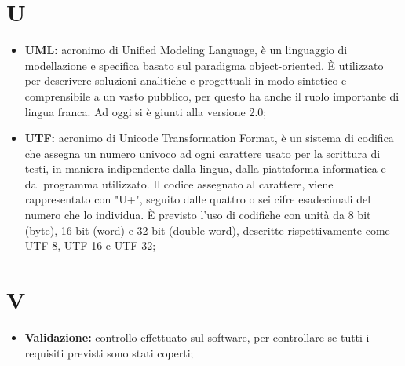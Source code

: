 %



\section*{U} %
\label{sec:u}
	\begin{itemize}
		\item \textbf{UML:} acronimo di Unified Modeling Language, è un linguaggio di modellazione e specifica basato sul paradigma object-oriented. È utilizzato per descrivere soluzioni analitiche e progettuali in modo sintetico e comprensibile a un vasto pubblico, per questo ha anche il ruolo importante di lingua franca. Ad oggi si è giunti alla versione 2.0;
		\item \textbf{UTF:} acronimo di Unicode Transformation Format, è un sistema di codifica che assegna un numero univoco ad ogni carattere usato per la scrittura di testi, in maniera indipendente dalla lingua, dalla piattaforma informatica e dal programma utilizzato. Il codice assegnato al carattere, viene rappresentato con "U+", seguito dalle quattro o sei cifre esadecimali del numero che lo individua. È previsto l'uso di codifiche con unità da 8 bit (byte), 16 bit (word) e 32 bit (double word), descritte rispettivamente come UTF-8, UTF-16 e UTF-32;
	\end{itemize}
\pagebreak

\section*{V} %
\label{sec:v}
	\begin{itemize}
		\item \textbf{Validazione:} controllo effettuato sul software, per controllare se tutti i requisiti previsti sono stati coperti;
	\end{itemize}
\pagebreak

